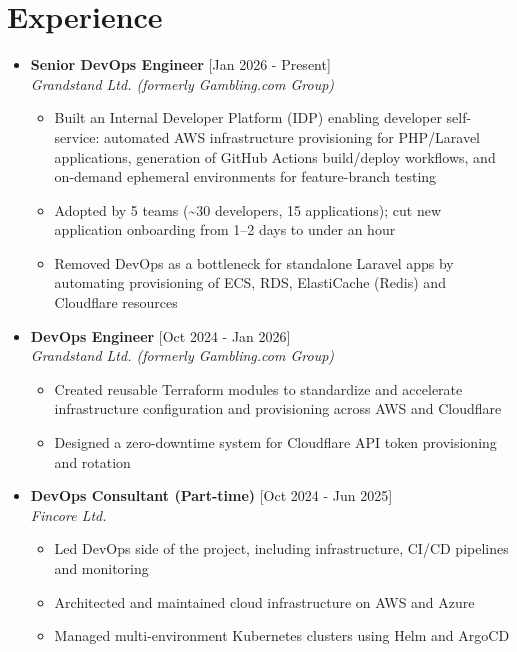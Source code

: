 \documentclass[12pt,a4paper]{moderncv}
\begin{document}
\makecvtitle

\vspace{-0.5em}
\section{Experience}

\begin{itemize}
	\item \textbf{Senior DevOps Engineer} \hfill [Jan 2026 - Present]\\
	\textit{Grandstand Ltd. (formerly Gambling.com Group)}
	\begin{itemize}
		\vspace{-0.75em}
		\setlength\itemsep{0.1em}
		\item Built an Internal Developer Platform (IDP) enabling developer self-service: automated AWS infrastructure provisioning for PHP/Laravel applications, generation of GitHub Actions build/deploy workflows, and on-demand ephemeral environments for feature-branch testing
		\item Adopted by 5 teams (\textasciitilde30 developers, 15 applications); cut new application onboarding from 1--2 days to under an hour
		\item Removed DevOps as a bottleneck for standalone Laravel apps by automating provisioning of ECS, RDS, ElastiCache (Redis) and Cloudflare resources
	\end{itemize}

	\item \textbf{DevOps Engineer} \hfill [Oct 2024 - Jan 2026]\\
	\textit{Grandstand Ltd. (formerly Gambling.com Group)}
	\begin{itemize}
		\vspace{-0.75em}
		\setlength\itemsep{0.1em}
		\item Created reusable Terraform modules to standardize and accelerate infrastructure configuration and provisioning across AWS and Cloudflare
		\item Designed a zero-downtime system for Cloudflare API token provisioning and rotation
	\end{itemize}

	\item \textbf{DevOps Consultant (Part-time)} \hfill [Oct 2024 - Jun 2025]\\
	\textit{Fincore Ltd.}
	\begin{itemize}
		\vspace{-0.75em}
		\setlength\itemsep{0.1em}
		\item Led DevOps side of the project, including infrastructure, CI/CD pipelines and monitoring
		\item Architected and maintained cloud infrastructure on AWS and Azure
		\item Managed multi-environment Kubernetes clusters using Helm and ArgoCD
	\end{itemize}


\end{itemize}
\end{document}
